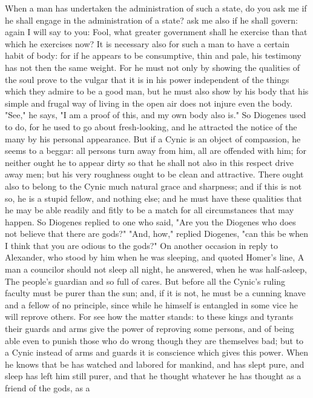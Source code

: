 \documentclass[a4paper]{article}
\begin{document}
When a man has undertaken the administration of such a state, do you ask me if
he shall engage in the administration of a state? ask me also if he shall
govern: again I will say to you: Fool, what greater government shall he
exercise than that which he exercises now?
    It is necessary also for such a man to have a certain habit of body: for if
he appears to be consumptive, thin and pale, his testimony has not then the
same weight. For he must not only by showing the qualities of the soul prove to
the vulgar that it is in his power independent of the things which they admire
to be a good man, but he must also show by his body that his simple and frugal
way of living in the open air does not injure even the body. "See," he says, "I
am a proof of this, and my own body also is." So Diogenes used to do, for he
used to go about fresh-looking, and he attracted the notice of the many by his
personal appearance. But if a Cynic is an object of compassion, he seems to a
beggar: all persons turn away from him, all are offended with him; for neither
ought he to appear dirty so that he shall not also in this respect drive away
men; but his very roughness ought to be clean and attractive.
    There ought also to belong to the Cynic much natural grace and sharpness;
and if this is not so, he is a stupid fellow, and nothing else; and he must
have these qualities that he may be able readily and fitly to be a match for
all circumstances that may happen. So Diogenes replied to one who said, "Are
you the Diogenes who does not believe that there are gods?" "And, how," replied
Diogenes, "can this be when I think that you are odious to the gods?" On
another occasion in reply to Alexander, who stood by him when he was sleeping,
and quoted Homer's line,
       A man a councilor should not sleep all night,
he answered, when he was half-asleep,
       The people's guardian and so full of cares.
    But before all the Cynic's ruling faculty must be purer than the sun; and,
if it is not, he must be a cunning knave and a fellow of no principle, since
while he himself is entangled in some vice he will reprove others. For see how
the matter stands: to these kings and tyrants their guards and arms give the
power of reproving some persons, and of being able even to punish those who do
wrong though they are themselves bad; but to a Cynic instead of arms and guards
it is conscience which gives this power. When he knows that be has watched and
labored for mankind, and has slept pure, and sleep has left him still purer,
and that he thought whatever he has thought as a friend of the gods, as a
\end{document}
